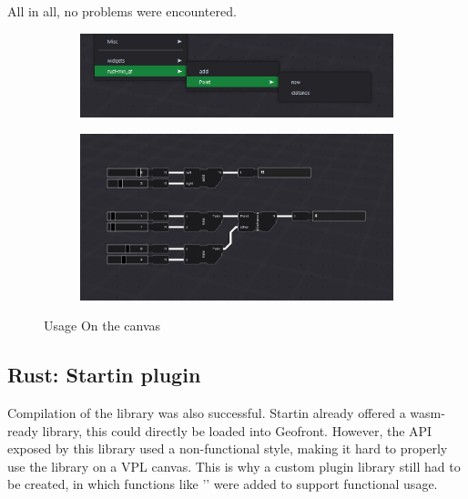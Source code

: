 All in all, no problems were encountered.

\begin{figure}
  \centering
  \begin{subfigure}[b]{0.45\linewidth}
    \graphicspath{{../../assets/images/6.1.1/}}
    \centering
    \includegraphics[width=\linewidth]{7.PNG}
    \caption{}\label{fig:rust-plugin-on-canvas:1}
  \end{subfigure}%
  \qquad %
  \begin{subfigure}[b]{0.45\linewidth}
    \graphicspath{{../../assets/images/6.1.1/}}
    \centering
    \includegraphics[width=\linewidth]{6.PNG}
    \caption{}\label{fig:rust-plugin-on-canvas:2}
  \end{subfigure}%
  \caption[minimal rust geofront plugin: usage]{Usage On the canvas}
  \label{fig:rust-plugin-on-canvas}
\end{figure}

\subsection{Rust: Startin plugin}

Compilation of the  library was also successful. 
Startin already offered a wasm-ready library, this could directly be loaded into Geofront. 
However, the API exposed by this library used a non-functional style, making it hard to properly use the library on a VPL canvas. 
This is why a custom plugin library still had to be created, in which functions like '' were added to support functional usage. 

